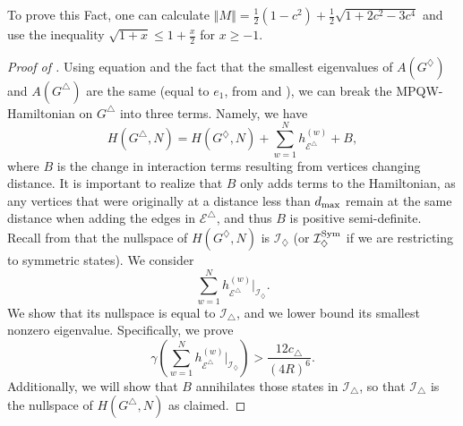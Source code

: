 \documentclass[../thesis-main/thesis-main]{subfiles}
\begin{document}
To prove this Fact, one can calculate $\left\Vert M\right\Vert =\frac{1}{2}(1-c^{2})+\frac{1}{2}\sqrt{1+2c^{2}-3c^{4}}$ and use the inequality $\sqrt{1+x}\leq1+\frac{x}{2}$ for $x\geq-1$.

\begin{proof}[Proof of \protect{}]  Using equation  and the fact that the smallest eigenvalues of $A(G^{\diamondsuit})$ and $A(G^{\triangle})$ are the same (equal to $e_{1}$, from  and ), we can break the MPQW-Hamiltonian on $G^\triangle$ into three terms.  Namely, we have
\begin{equation}
  H(G^{\triangle},N)=H(G^{\diamondsuit},N)+\sum_{w=1}^{N}h_{\mathcal{E}^{\triangle}}^{(w)} + B,\label{eq:H_G^triangle,diamond}
\end{equation}
where $B$ is the change in interaction terms resulting from vertices changing distance.  It is important to realize that $B$ only adds terms to the Hamiltonian, as any vertices that were originally at a distance less than $d_{\text{max}}$ remain at the same distance when adding the edges in $\mathcal{E}^\triangle$, and thus $B$ is positive semi-definite.  Recall from  that the nullspace of $H(G^{\diamondsuit},N)$ is $\mathcal{I}_{\diamondsuit}$ (or $\mathcal{I}_\diamondsuit^{\operatorname{Sym}}$ if we are restricting to symmetric states). We consider 
\begin{equation}
  \sum_{w=1}^{N}h_{\mathcal{E}^{\triangle}}^{(w)}\bigg|_{\mathcal{I}_{\diamondsuit}}.\label{eq:restriction to script R}
\end{equation}
We show that its nullspace is equal to $\mathcal{I}_{\triangle}$, and we lower bound its smallest nonzero eigenvalue. Specifically, we prove
\begin{equation}
  \gamma\left(\sum_{w=1}^{N}h_{\mathcal{E}^{\triangle}}^{(w)}\bigg|_{\mathcal{I}_{\diamondsuit}}\right)>\frac{12c_{\triangle}}{(4R)^{6}}.\label{eq:bound_R6}
\end{equation}
Additionally, we will show that $B$ annihilates those states in $\mathcal{I}_{\triangle}$, so that $\mathcal{I}_{\triangle}$ is the nullspace of $H(G^{\triangle},N)$ as claimed.


\end{proof}
\end{document}
